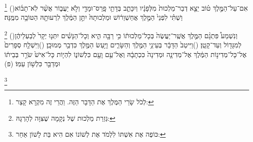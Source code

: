 \documentclass[12pt, openany]{book}
\newcommand{\footnotecomment}[1]{
	\renewcommand\thefootnote{}
	\footnote{\textsf{#1}}}
\newcommand{\commenta}[1]{\footnotecomment{#1}\hspace{0em}}
\newcommand{\vsnum}[1]{(\hebrewnumeral{#1})\space}
\begin{document}
\begin{multicols}{2}
\commenta{ לְכֹל שָׂרֵי הַמֶּלֶךְ אֶת הַדָּבָר הַזֶּה. וַהֲרֵי זֶה מִקְרָא קָצֵר:}%
\vsnum{19}אִם־עַל־הַמֶּ֣לֶךְ ט֗וֹב יֵצֵ֤א דְבַר־מַלְכוּת֙ מִלְּפָנָ֔יו וְיִכָּתֵ֛ב בְּדָתֵ֥י פָֽרַס־וּמָדַ֖י וְלֹ֣א יַעֲב֑וֹר אֲשֶׁ֨ר לֹֽא־תָב֜וֹא וַשְׁתִּ֗י לִפְנֵי֙ הַמֶּ֣לֶךְ אֲחַשְׁוֵר֔וֹשׁ וּמַלְכוּתָהּ֙ יִתֵּ֣ן הַמֶּ֔לֶךְ לִרְעוּתָ֖הּ הַטּוֹבָ֥ה מִמֶּֽנָּה׃%
\commenta{ גְּזֵרַת מַלְכוּת שֶׁל נְקָמָה שֶׁצִּוָּה לְהָרְגָהּ:}%
\vsnum{20}וְנִשְׁמַע֩ פִּתְגָ֨ם הַמֶּ֤לֶךְ אֲשֶֽׁר־יַעֲשֶׂה֙ בְּכָל־מַלְכוּת֔וֹ כִּ֥י רַבָּ֖ה הִ֑יא וְכָל־הַנָּשִׁ֗ים יִתְּנ֤וּ יְקָר֙ לְבַעְלֵיהֶ֔ן לְמִגָּד֖וֹל וְעַד־קָטָֽן׃
\vsnum{21}וַיִּיטַב֙ הַדָּבָ֔ר בְּעֵינֵ֥י הַמֶּ֖לֶךְ וְהַשָּׂרִ֑ים וַיַּ֥עַשׂ הַמֶּ֖לֶךְ כִּדְבַ֥ר מְמוּכָֽן׃
\vsnum{22}וַיִּשְׁלַ֤ח סְפָרִים֙ אֶל־כָּל־מְדִינ֣וֹת הַמֶּ֔לֶךְ אֶל־מְדִינָ֤ה וּמְדִינָה֙ כִּכְתָבָ֔הּ וְאֶל־עַ֥ם וָעָ֖ם כִּלְשׁוֹנ֑וֹ לִהְי֤וֹת כָּל־אִישׁ֙ שֹׂרֵ֣ר בְּבֵית֔וֹ וּמְדַבֵּ֖ר כִּלְשׁ֥וֹן עַמּֽוֹ׃ (פ)%
\commenta{ כּוֹפֶה אֶת אִשְׁתּוֹ לִלְמֹד אֶת לְשׁוֹנוֹ אִם הִיא בַּת לָשׁוֹן אַחֵר:}%
\end{multicols}\clearpage
\end{document}
